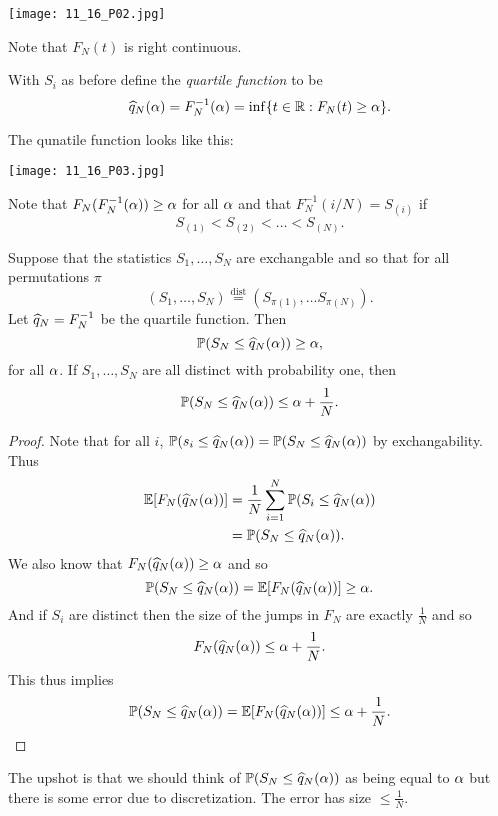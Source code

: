 \begin{center}
    \texttt{[image: 11\_16\_P02.jpg]}
\end{center}

Note that $F_N(t)$ is right continuous.
\begin{defn}
    With $S_i$ as before define the \emph{quartile function} to be
    \[\widehat{q}_N({\alpha})=F_N^{-1}({\alpha}) = \inf\{t \in {\mathbb R} : F_N(t) \ge {\alpha}\}.\]
\end{defn}
The qunatile function looks like this:
\begin{center}
    \texttt{[image: 11\_16\_P03.jpg]}
\end{center}
Note that $F_N(F_N^{-1}({\alpha})) \ge {\alpha}$ for all ${\alpha}$ and that $F_N^{-1}(i/N) = S_{(i)}$ if 
\[S_{(1)} < S_{(2)} < \ldots < S_{(N)}.\]
\begin{thrm}
    Suppose that the statistics $S_1,\ldots, S_N$ are exchangable and so that for all permutations $\pi$
    \[(S_1,\ldots, S_N) \stackrel{\text{dist}}{=} (S_{\pi(1)},\ldots S_{\pi(N)}).\]
    Let $\widehat{q}_N = F_N^{-1}$ be the quartile function. Then 
    \[ {\mathbb{P}}(S_N \le \widehat{q}_N({\alpha})) \ge {\alpha},\]
    for all ${\alpha}$. If $S_1,\ldots, S_N$ are all distinct with probability one, then
    \[{\mathbb{P}}(S_N \le \widehat{q}_N({\alpha})) \le {\alpha} + \frac{1}{N}. \]
\end{thrm}
\begin{proof}
    Note that for all $i$, ${\mathbb{P}}(s_i \le \widehat{q}_N({\alpha})) = {\mathbb{P}}(S_N \le \widehat{q}_N({\alpha}))$ by exchangability. Thus
    \begin{align*}
        {\mathbb{E}}[F_N(\widehat{q}_N({\alpha}))]&=\frac{1}{N}\sum_{i=1}^N {\mathbb{P}}(S_i \le \widehat{q}_N({\alpha}))\\
        &={\mathbb{P}}(S_N \le \widehat{q}_N({\alpha})).
    \end{align*}
    We also know that $F_N(\widehat{q}_N({\alpha})) \ge {\alpha}$ and so 
    \[{\mathbb{P}}(S_N \le \widehat{q}_N({\alpha})) = {\mathbb{E}}[F_N(\widehat{q}_N({\alpha}))] \ge {\alpha}. \]
    And if $S_i$ are distinct then the size of the jumps in $F_N$ are exactly $\frac{1}{N}$ and so 
    \[F_N(\widehat{q}_N({\alpha})) \le {\alpha} + \frac{1}{N}. \]
    This thus implies
    \[{\mathbb{P}}(S_N \le \widehat{q}_N({\alpha})) = {\mathbb{E}}[F_N(\widehat{q}_N({\alpha}))] \le {\alpha}+\frac{1}{N}.\] 
\end{proof}
The upshot is that we should think of ${\mathbb{P}}(S_N \le \widehat{q}_N({\alpha}))$ as being equal to ${\alpha}$ but there is some error due to discretization. The error has size $\le \frac{1}{N}$. 

